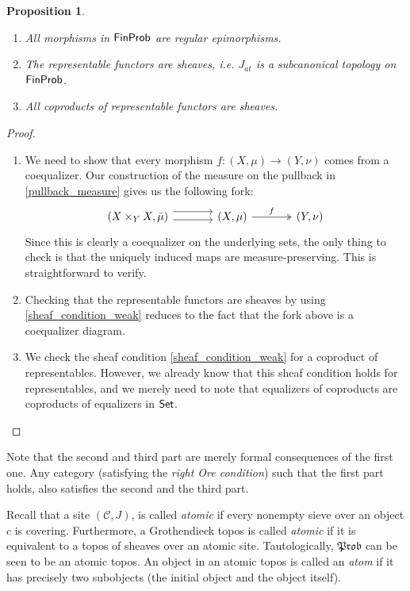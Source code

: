\documentclass[a4paper]{amsproc}
\theoremstyle{plain}
\newtheorem{proposition}[theorem]{Proposition}
\theoremstyle{definition}
\theoremstyle{remark}
\numberwithin{equation}{section}
\newcommand{\Set}{\textup{\textsf{Set}}}
\newcommand{\FinProb}{\textup{\textsf{FinProb}}}
\newcommand{\C}{\mathcal{C}}
\newcommand{\Prob}{\mathfrak{Prob}}
\begin{document}
\begin{proposition}\label{subcanonical}
    \mbox{}
    \begin{enumerate}
        \item All morphisms in $\FinProb$ are regular epimorphisms.
        \item The representable functors are sheaves, i.e. $J_{at}$ is a subcanonical topology on $\FinProb$.
        \item All coproducts of representable functors are sheaves.
    \end{enumerate}
\end{proposition}
\begin{proof}
    \mbox{}
    \begin{enumerate}
        \item We need to show that every morphism $f:(X,\mu)\rightarrow (Y, \nu)$ comes from a coequalizer. Our construction of the measure on the pullback in \ref{pullback_measure} gives us the following fork:
        \[
        \begin{tikzcd}[column sep=large]
        (X \times_Y X, \bar{\mu}) \arrow[r, shift left=2] \arrow[r, shift right] & (X,\mu) \arrow[r, "f", two heads] & (Y,\nu)
        \end{tikzcd}
        \]
        Since this is clearly a coequalizer on the underlying sets, the only thing to check is that the uniquely induced maps are measure-preserving. This is straightforward to verify.

        \item Checking that the representable functors are sheaves by using \ref{sheaf_condition_weak} reduces to the fact that the fork above is a coequalizer diagram.

        \item We check the sheaf condition \ref{sheaf_condition_weak} for a coproduct of representables. However, we already know that this sheaf condition holds for representables, and we merely need to note that equalizers of coproducts are coproducts of equalizers in $\Set$.
    \end{enumerate}
\end{proof}

Note that the second and third part are merely formal consequences of the first one. Any category (satisfying the \emph{right Ore condition}) such that the first part holds, also satisfies the second and the third part.

Recall that a site $(\C, J)$, is called \emph{atomic} if every nonempty sieve over an object $c$ is covering. Furthermore, a Grothendieck topos is called \emph{atomic} if it is equivalent to a topos of sheaves over an atomic site. Tautologically, $\Prob$ can be seen to be an atomic topos. An object in an atomic topos is called an \emph{atom} if it has precisely two subobjects (the initial object and the object itself).
\end{document}
